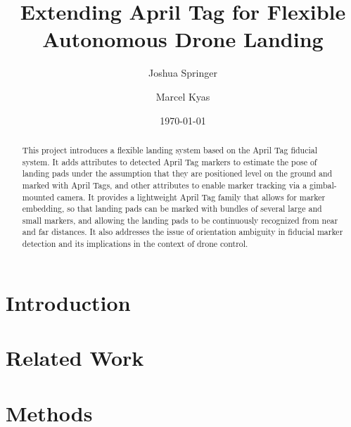 \documentclass[conference]{IEEEtran}
\author{Joshua Springer \and Marcel Kyas}
\title{Extending April Tag for Flexible Autonomous Drone Landing}
\date{\specialdate\today}
\begin{document}
    \maketitle

    \begin{abstract}
        This project introduces a flexible landing system based on the April Tag\cite{apriltag3_paper} fiducial system.
        It adds attributes to detected April Tag markers to estimate the pose of landing pads
        under the assumption that they are positioned level on the ground and marked with April Tags,
        and other attributes to enable marker tracking via a gimbal-mounted camera.
        It provides a lightweight April Tag family that allows for marker embedding,
        so that landing pads can be marked with bundles of several large and small markers,
        and allowing the landing pads to be continuously recognized from near and far distances.
        It also addresses the issue of orientation ambiguity in fiducial marker detection
        and its implications in the context of drone control.
    \end{abstract}
    

    \section{Introduction}
    \label{section:introduction}
    

    \section{Related Work}
    \label{section:related_work}
    

    \section{Methods}
    \label{section:methods}
    

    
    
\end{document}
